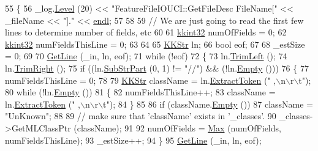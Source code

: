 \begin{DoxyCode}
55 \{
56   \_log.\hyperlink{class_k_k_b_1_1_run_log_a32cf761d7f2e747465fd80533fdbb659}{Level} (20) << \textcolor{stringliteral}{"FeatureFileIOUCI::GetFileDesc     FileName["} << \_fileName << \textcolor{stringliteral}{"]."} << 
      \hyperlink{namespace_k_k_b_ad1f50f65af6adc8fa9e6f62d007818a8}{endl};
57 
58 
59   \textcolor{comment}{// We are just going to read the first few lines to determine number of fields, etc}
60  
61   \hyperlink{namespace_k_k_b_a8fa4952cc84fda1de4bec1fbdd8d5b1b}{kkint32}  numOfFields       = 0;
62   \hyperlink{namespace_k_k_b_a8fa4952cc84fda1de4bec1fbdd8d5b1b}{kkint32}  numFieldsThisLine = 0;
63 
64 
65   \hyperlink{class_k_k_b_1_1_k_k_str}{KKStr}  ln;
66   \textcolor{keywordtype}{bool}   eof;
67 
68   \_estSize = 0;
69 
70   \hyperlink{class_k_k_m_l_l_1_1_feature_file_i_o_a61ca11485d2c14368c1019bfcc53ab16}{GetLine} (\_in, ln, eof);
71   \textcolor{keywordflow}{while}  (!eof)
72   \{
73     ln.\hyperlink{class_k_k_b_1_1_k_k_str_af7c102c53103ddff3f48270b4a198c89}{TrimLeft} ();
74     ln.\hyperlink{class_k_k_b_1_1_k_k_str_aa912161f17871e2d6fec7bbac033221c}{TrimRight} ();
75     \textcolor{keywordflow}{if}  ((ln.\hyperlink{class_k_k_b_1_1_k_k_str_a5f20b2ddfc9f07c8ef99592810332ddb}{SubStrPart} (0, 1) != \textcolor{stringliteral}{"//"})  &&  (!ln.\hyperlink{class_k_k_b_1_1_k_k_str_ac69942f73fffd672ec2a6e1c410afdb6}{Empty} ()))
76     \{
77       numFieldsThisLine = 0;
78 
79       \hyperlink{class_k_k_b_1_1_k_k_str}{KKStr}  className = ln.\hyperlink{class_k_k_b_1_1_k_k_str_acc31c95308d6d699debde883c11e5802}{ExtractToken} (\textcolor{stringliteral}{" ,\(\backslash\)n\(\backslash\)r\(\backslash\)t"});
80       \textcolor{keywordflow}{while} (!ln.\hyperlink{class_k_k_b_1_1_k_k_str_ac69942f73fffd672ec2a6e1c410afdb6}{Empty} ())
81       \{
82         numFieldsThisLine++;
83         className = ln.\hyperlink{class_k_k_b_1_1_k_k_str_acc31c95308d6d699debde883c11e5802}{ExtractToken} (\textcolor{stringliteral}{" ,\(\backslash\)n\(\backslash\)r\(\backslash\)t"});
84       \}
85 
86       \textcolor{keywordflow}{if}  (className.\hyperlink{class_k_k_b_1_1_k_k_str_ac69942f73fffd672ec2a6e1c410afdb6}{Empty} ())
87         className = \textcolor{stringliteral}{"UnKnown"};
88 
89       \textcolor{comment}{// make sure that 'className' exists in '\_classes'.}
90       \_classes->GetMLClassPtr (className);
91 
92       numOfFields = \hyperlink{namespace_k_k_b_a25e187e24c091586293725f27f007ad7}{Max} (numOfFields, numFieldsThisLine);
93       \_estSize++;
94     \}
95     \hyperlink{class_k_k_m_l_l_1_1_feature_file_i_o_a61ca11485d2c14368c1019bfcc53ab16}{GetLine} (\_in, ln, eof);

\end{DoxyCode}
